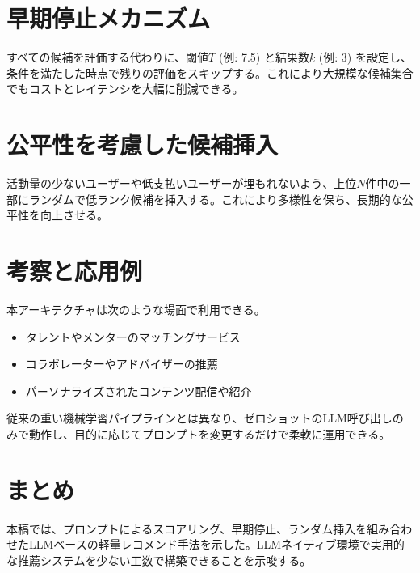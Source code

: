 \documentclass[11pt]{article}
\begin{document}
\section{早期停止メカニズム}
すべての候補を評価する代わりに、閾値\(T\) (例: 7.5) と結果数\(k\) (例: 3) を設定し、条件を満たした時点で残りの評価をスキップする。これにより大規模な候補集合でもコストとレイテンシを大幅に削減できる。

\section{公平性を考慮した候補挿入}
活動量の少ないユーザーや低支払いユーザーが埋もれないよう、上位\(N\)件中の一部にランダムで低ランク候補を挿入する。これにより多様性を保ち、長期的な公平性を向上させる。

\section{考察と応用例}
本アーキテクチャは次のような場面で利用できる。
\begin{itemize}
    \item タレントやメンターのマッチングサービス
    \item コラボレーターやアドバイザーの推薦
    \item パーソナライズされたコンテンツ配信や紹介
\end{itemize}
従来の重い機械学習パイプラインとは異なり、ゼロショットのLLM呼び出しのみで動作し、目的に応じてプロンプトを変更するだけで柔軟に運用できる。

\section{まとめ}
本稿では、プロンプトによるスコアリング、早期停止、ランダム挿入を組み合わせたLLMベースの軽量レコメンド手法を示した。LLMネイティブ環境で実用的な推薦システムを少ない工数で構築できることを示唆する。
\end{document}
